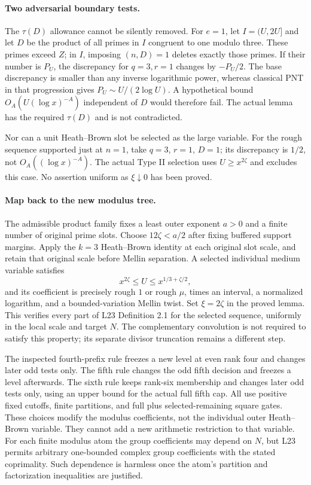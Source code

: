 \paragraph{Two adversarial boundary tests.}
The $\tau(D)$ allowance cannot be silently removed. For $e=1$, let
$I=(U,2U]$ and let $D$ be the product of all primes in $I$ congruent
to one modulo three. These primes exceed $Z$; in $I$, imposing
$(n,D)=1$ deletes exactly those primes. If their number is $P_U$, the
discrepancy for $q=3,r=1$ changes by $-P_U/2$. The base discrepancy
is smaller than any inverse logarithmic power, whereas classical PNT
in that progression gives $P_U\sim U/(2\log U)$. A hypothetical bound
$O_A(U(\log x)^{-A})$ independent of $D$ would therefore fail.
The actual lemma has the required $\tau(D)$ and is not contradicted.

Nor can a unit Heath--Brown slot be selected as the large variable.
For the rough sequence supported just at $n=1$, take $q=3$, $r=1$,
$D=1$; its discrepancy is $1/2$, not $O_A((\log x)^{-A})$.
The actual Type II selection uses $U\ge x^{2\zeta}$ and excludes this
case. No assertion uniform as $\xi\downarrow0$ has been proved.

\paragraph{Map back to the new modulus tree.}
The admissible product family fixes a least outer exponent $a>0$ and
a finite number of original prime slots. Choose $12\zeta<a/2$ after
fixing buffered support margins. Apply the $k=3$ Heath--Brown identity
at each original slot scale, and retain that original scale before
Mellin separation. A selected individual medium variable satisfies
\[
 x^{2\zeta}\le U\le x^{1/3+\zeta/2},
\]
and its coefficient is precisely rough $1$ or rough $\mu$, times an
interval, a normalized logarithm, and a bounded-variation Mellin twist.
Set $\xi=2\zeta$ in the proved lemma. This verifies every part of
L23 Definition 2.1 for the selected sequence, uniformly in the local
scale and target $N$. The complementary convolution is not required
to satisfy this property; its separate divisor truncation remains a
different step.

The inspected fourth-prefix rule freezes a new level at even rank four
and changes later odd tests only. The fifth rule changes the odd fifth
decision and freezes a level afterwards. The sixth rule keeps rank-six
membership and changes later odd tests only, using an upper bound for
the actual full fifth cap. All use positive fixed cutoffs, finite
partitions, and full plus selected-remaining square gates. These
choices modify the modulus coefficients, not the individual outer
Heath--Brown variable. They cannot add a new arithmetic restriction to
that variable. For each finite modulus atom the group coefficients may
depend on $N$, but L23 permits arbitrary one-bounded complex group
coefficients with the stated coprimality. Such dependence is harmless
once the atom's partition and factorization inequalities are justified.

